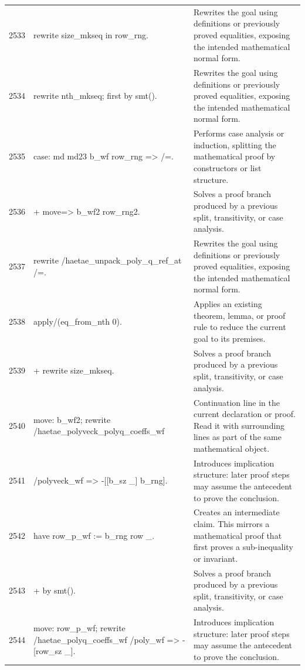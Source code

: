 \documentclass[10pt]{article}
\begin{document}
\begin{longtable}{r L{0.53\textwidth} L{0.37\textwidth}}
2533 & {\ttfamily\scriptsize rewrite size\_mkseq in row\_rng.} & Rewrites the goal using definitions or previously proved equalities, exposing the intended mathematical normal form. \\
2534 & {\ttfamily\scriptsize rewrite nth\_mkseq; first by smt().} & Rewrites the goal using definitions or previously proved equalities, exposing the intended mathematical normal form. \\
2535 & {\ttfamily\scriptsize case: md md23 b\_wf row\_rng => /=.} & Performs case analysis or induction, splitting the mathematical proof by constructors or list structure. \\
2536 & {\ttfamily\scriptsize + move=> b\_wf2 row\_rng2.} & Solves a proof branch produced by a previous split, transitivity, or case analysis. \\
2537 & {\ttfamily\scriptsize   rewrite /haetae\_unpack\_poly\_q\_ref\_at /=.} & Rewrites the goal using definitions or previously proved equalities, exposing the intended mathematical normal form. \\
2538 & {\ttfamily\scriptsize   apply/(eq\_from\_nth 0).} & Applies an existing theorem, lemma, or proof rule to reduce the current goal to its premises. \\
2539 & {\ttfamily\scriptsize   + rewrite size\_mkseq.} & Solves a proof branch produced by a previous split, transitivity, or case analysis. \\
2540 & {\ttfamily\scriptsize     move: b\_wf2; rewrite /haetae\_polyveck\_polyq\_coeffs\_wf} & Continuation line in the current declaration or proof.  Read it with surrounding lines as part of the same mathematical object. \\
2541 & {\ttfamily\scriptsize                        /polyveck\_wf => -[[b\_sz \_] b\_rng].} & Introduces implication structure: later proof steps may assume the antecedent to prove the conclusion. \\
2542 & {\ttfamily\scriptsize     have row\_p\_wf := b\_rng row \_.} & Creates an intermediate claim.  This mirrors a mathematical proof that first proves a sub-inequality or invariant. \\
2543 & {\ttfamily\scriptsize     + by smt().} & Solves a proof branch produced by a previous split, transitivity, or case analysis. \\
2544 & {\ttfamily\scriptsize     move: row\_p\_wf; rewrite /haetae\_polyq\_coeffs\_wf /poly\_wf => -[row\_sz \_].} & Introduces implication structure: later proof steps may assume the antecedent to prove the conclusion. \\

\end{longtable}
\end{document}
